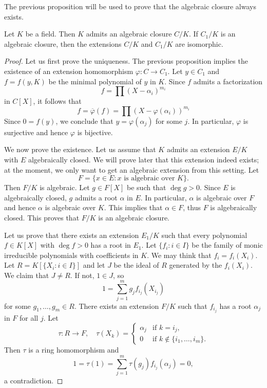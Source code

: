 
The previous proposition will be used to prove 
that the algebraic closure always exists. 

\begin{theorem}[Artin]\label{thm:Artin}
	Let $K$ be a field. Then $K$ admits an algebraic closure $C/K$. If $C_1/K$
	is an algebraic closure, then the extensions $C/K$ and $C_1/K$ are
	isomorphic. 
\end{theorem}

\begin{proof}
    Let us first prove the uniqueness. The previous proposition implies the existence of 
    an extension homomorphism $\varphi\colon C\to C_1$. Let $y\in C_1$ and $f=f(y,K)$ be 
    the minimal polynomial of $y$ in $K$. Since $f$ admits a factorization
    \[
        f=\prod (X-\alpha_i)^{m_i}
    \]
    in $C[X]$, it follows that
    \[
    f=\overline{\varphi}(f)=\prod (X-\varphi(\alpha_i))^{m_i}
    \]
    Since $0=f(y)$, we conclude that $y=\varphi(\alpha_j)$ for some $j$. In particular, $\varphi$ is
    surjective and hence $\varphi$ is bijective. 
    
    We now prove the existence. Let us assume that $K$ admits an extension $E/K$ 
    with $E$ algebraically closed. We will prove later that this extension indeed exists; at the moment,
    we only want to get an algebraic extension from this setting. Let 
    \[
    	F=\{x\in E:x\text{ is algebraic over }K\}. 
    \]
    Then $F/K$ is algebraic. Let $g\in F[X]$ be such that
    $\deg g>0$. Since $E$ is algebraically closed, $g$ admits a root $\alpha$ in $E$. In particular, $\alpha$
    is algebraic over $F$ and hence $\alpha$ is algebraic over $K$. This implies that $\alpha\in F$, thus
    $F$ is algebraically closed. This proves that $F/K$ is an algebraic closure. 
    
    Let us prove that there exists an extension $E_1/K$ such that
    every polynomial $f\in K[X]$ with $\deg f>0$ has a root in $E_1$. Let 
    $\{f_i:i\in I\}$ be the family of monic irreducible polynomials with coefficients in $K$. 
    We may think that $f_i=f_i(X_i)$. 
    Let $R=K[\{X_i:i\in I\}]$ and let $J$ be the ideal of $R$ 
    generated by the $f_i(X_i)$. We claim that $J\ne R$. If not, $1\in J$, so
    \[
    1=\sum_{j=1}^m g_jf_{i_j}(X_{i_j})
    \]
    for some $g_1,\dots,g_m\in R$. There exists an extension $F/K$ such that
    $f_{i_j}$ has a root $\alpha_j$ in $F$ for all $j$. Let 
    \[
    \tau\colon R\to F,\quad
    \tau(X_k)=\begin{cases}
        \alpha_j & \text{if $k=i_j$},\\
        0 & \text{if $k\not\in\{i_1,\dots,i_m\}$}.
        \end{cases}
    \]
    Then $\tau$ is a ring homomorphism and 
    \[
    1=\tau(1)=\sum_{j=1}^m\tau(g_j)f_{i_j}(\alpha_{j})=0,
    \]
    a contradiction. 
    

\end{proof}
